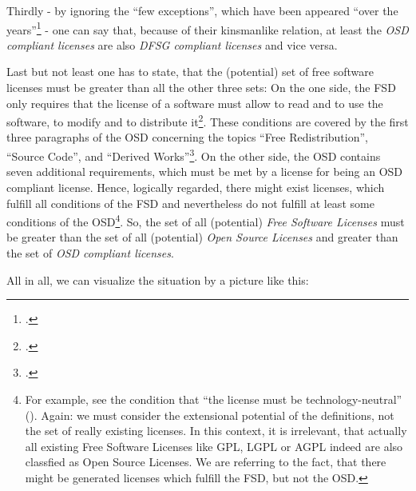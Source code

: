 Thirdly - by ignoring the \enquote{few exceptions}, which have been appeared
\enquote{over the years}\footcite[cf.][233]{Fogel2006a} - one can say that,
because of their kinsmanlike relation, at least the \emph{OSD compliant
licenses} are also \emph{DFSG compliant licenses} and vice versa.

Last but not least one has to state, that the (potential) set of free software
licenses must be greater than all the other three sets: On the one side, the FSD
only requires that the license of a software must allow to read and to use the
software, to modify and to distribute it\footcite[cf.][41]{Stallman1996a}. These
conditions are covered by the first three paragraphs of the OSD concerning the
topics \enquote{Free Redistribution}, \enquote{Source Code}, and
\enquote{Derived Works}\footcite[cf.][\nopage wp]{OSI2012a}. On the other side,
the OSD contains seven additional requirements, which must be met by a license
for being an OSD compliant license. Hence, logically regarded, there might exist
licenses, which fulfill all conditions of the FSD and nevertheless do not
fulfill at least some conditions of the OSD\footnote{For example, see the
condition that \enquote{the license must be technology-neutral}
(\cite[cf.][\nopage wp]{OSI2012a}). Again: we must consider the extensional
potential of the definitions, not the set of really existing licenses.
In this context, it is irrelevant, that actually all existing Free Software
Licenses like GPL, LGPL or AGPL indeed are also classfied as Open Source
Licenses. We are referring to the fact, that there might be generated licenses
which fulfill the FSD, but not the OSD.}. So, the set of all (potential)
\emph{Free Software Licenses} must be greater than the set of all (potential)
\emph{Open Source Licenses} and greater than the set of \emph{OSD compliant
licenses}.

All in all, we can visualize the situation by a picture like this:

